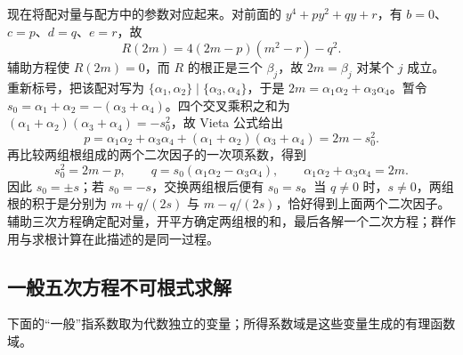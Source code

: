 \ProseParagraphBreak
现在将配对量与配方中的参数对应起来。对前面的 \(y^4+py^2+qy+r\)，有 \(b=0\)、\(c=p\)、\(d=q\)、\(e=r\)，故
\[
	R(2m)=4(2m-p)(m^2-r)-q^2.
\]
辅助方程使 \(R(2m)=0\)，而 \(R\) 的根正是三个 \(\beta_j\)，故 \(2m=\beta_j\) 对某个 \(j\) 成立。重新标号，把该配对写为 \(\{\alpha_1,\alpha_2\}\mid\{\alpha_3,\alpha_4\}\)，于是 \(2m=\alpha_1\alpha_2+\alpha_3\alpha_4\)。暂令 \(s_0=\alpha_1+\alpha_2=-(\alpha_3+\alpha_4)\)。四个交叉乘积之和为 \((\alpha_1+\alpha_2)(\alpha_3+\alpha_4)=-s_0^2\)，故 Vieta 公式给出
\[
	p=\alpha_1\alpha_2+\alpha_3\alpha_4 +(\alpha_1+\alpha_2)(\alpha_3+\alpha_4)=2m-s_0^2.
\]
再比较两组根组成的两个二次因子的一次项系数，得到
\[
	s_0^2=2m-p,\qquad q=s_0(\alpha_1\alpha_2-\alpha_3\alpha_4),\qquad \alpha_1\alpha_2+\alpha_3\alpha_4=2m.
\]
因此 \(s_0=\pm s\)；若 \(s_0=-s\)，交换两组根后便有 \(s_0=s\)。当 \(q\neq0\) 时，\(s\neq0\)，两组根的积于是分别为 \(m+q/(2s)\) 与 \(m-q/(2s)\)，恰好得到上面两个二次因子。辅助三次方程确定配对量，开平方确定两组根的和，最后各解一个二次方程；群作用与求根计算在此描述的是同一过程。

\subsection{一般五次方程不可根式求解}
\label{b1:subsec:2103:02}

下面的“一般”指系数取为代数独立的变量；所得系数域是这些变量生成的有理函数域。

